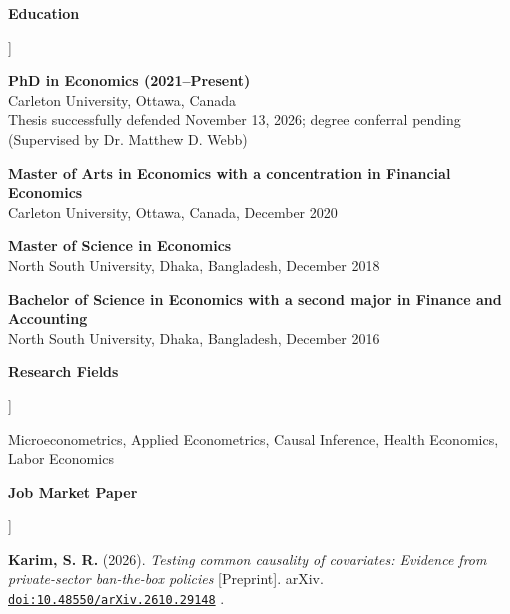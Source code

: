 \documentclass[11pt]{article}
\newcommand{\cvlabel}[1]{%
    \raisebox{0pt}[0pt][0pt]{%
        \parbox[t]{1.38in}{%
            \raggedright
            \bfseries
            #1
        }%
    }%
}
\newcommand{\myname}{\textbf{Karim, S. R.}}
\newcommand{\smallgap}{%
    \vspace{0.45em}
}
\newcommand{\doi}[1]{%
    \href{https://doi.org/#1}{\nolinkurl{doi:#1}}%
}
\begin{document}
\begin{cvsections}

\item[\cvlabel{Education}]

\textbf{PhD in Economics (2021--Present)}
\\
Carleton University, Ottawa, Canada
\\
Thesis successfully defended November 13, 2026; degree conferral pending
\\
(Supervised by Dr. Matthew D. Webb)

\smallgap

\textbf{Master of Arts in Economics with a concentration in Financial Economics}
\\
Carleton University, Ottawa, Canada, December 2020

\smallgap

\textbf{Master of Science in Economics}
\\
North South University, Dhaka, Bangladesh, December 2018

\smallgap

\textbf{Bachelor of Science in Economics with a second major in Finance and Accounting}
\\
North South University, Dhaka, Bangladesh, December 2016


\item[\cvlabel{Research Fields}]

Microeconometrics, Applied Econometrics, Causal Inference,
Health Economics, Labor Economics


\item[\cvlabel{Job Market Paper}]

\begin{cvitems}

\item
\myname{} (2026).
\textit{
Testing common causality of covariates:
Evidence from private-sector ban-the-box policies} [Preprint]. arXiv. \doi{10.48550/arXiv.2610.29148}.

\end{cvitems}



\end{cvsections}
\end{document}
